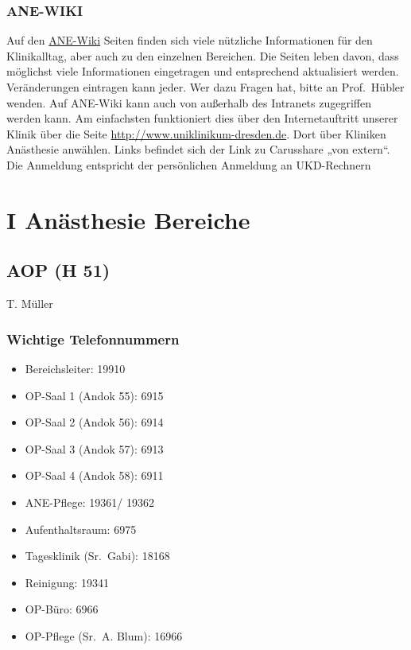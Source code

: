 \documentclass[
]{book}
\providecommand{\tightlist}{%
  \setlength{\itemsep}{0pt}\setlength{\parskip}{0pt}}
\begin{document}
\hypertarget{ane-wiki}{%
\section*{ANE-WIKI}\label{ane-wiki}}

Auf den \href{https://carusshare.uniklinikum-dresden.de/kiz/ane/anewiki/Wiki/Homepage.aspx}{ANE-Wiki} Seiten finden sich viele nützliche Informationen für den Klinikalltag, aber auch zu den einzelnen Bereichen. Die Seiten leben davon, dass möglichst viele Informationen eingetragen und entsprechend aktualisiert werden. Veränderungen eintragen kann jeder. Wer dazu Fragen hat, bitte an Prof.~Hübler wenden.
Auf ANE-Wiki kann auch von außerhalb des Intranets zugegriffen werden kann. Am einfachsten funktioniert dies über den Internetauftritt unserer Klinik über die Seite \url{http://www.uniklinikum-dresden.de}. Dort über Kliniken Anästhesie anwählen. Links befindet sich der Link zu Carusshare „von extern``. Die Anmeldung entspricht der persönlichen Anmeldung an UKD-Rechnern 

\hypertarget{part-i-anuxe4sthesie-bereiche}{%
\part{I Anästhesie Bereiche}\label{part-i-anuxe4sthesie-bereiche}}

\hypertarget{aop-h-51}{%
\chapter{AOP (H 51)}\label{aop-h-51}}

T. Müller

\hypertarget{wichtige-telefonnummern}{%
\section{Wichtige Telefonnummern}\label{wichtige-telefonnummern}}

\begin{itemize}
\tightlist
\item
  Bereichsleiter: 19910
\item
  OP-Saal 1 (Andok 55): 6915
\item
  OP-Saal 2 (Andok 56): 6914
\item
  OP-Saal 3 (Andok 57): 6913
\item
  OP-Saal 4 (Andok 58): 6911
\item
  ANE-Pflege: 19361/ 19362
\item
  Aufenthaltsraum: 6975
\item
  Tagesklinik (Sr.~Gabi): 18168
\item
  Reinigung: 19341
\item
  OP-Büro: 6966\\
\item
  OP-Pflege (Sr.~A. Blum): 16966
\end{itemize}
\end{document}
